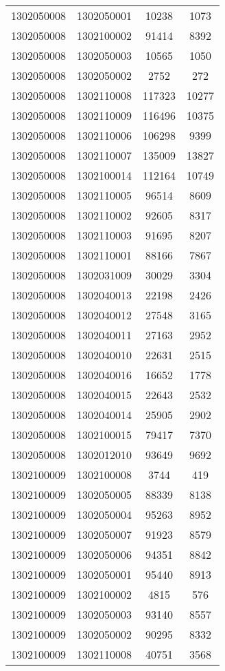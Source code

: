 \begin{longtable}{llcc}
1302050008 & 1302050001 & 10238 & 1073\\
1302050008 & 1302100002 & 91414 & 8392\\
1302050008 & 1302050003 & 10565 & 1050\\
1302050008 & 1302050002 & 2752 & 272\\
1302050008 & 1302110008 & 117323 & 10277\\
1302050008 & 1302110009 & 116496 & 10375\\
1302050008 & 1302110006 & 106298 & 9399\\
1302050008 & 1302110007 & 135009 & 13827\\
1302050008 & 1302100014 & 112164 & 10749\\
1302050008 & 1302110005 & 96514 & 8609\\
1302050008 & 1302110002 & 92605 & 8317\\
1302050008 & 1302110003 & 91695 & 8207\\
1302050008 & 1302110001 & 88166 & 7867\\
1302050008 & 1302031009 & 30029 & 3304\\
1302050008 & 1302040013 & 22198 & 2426\\
1302050008 & 1302040012 & 27548 & 3165\\
1302050008 & 1302040011 & 27163 & 2952\\
1302050008 & 1302040010 & 22631 & 2515\\
1302050008 & 1302040016 & 16652 & 1778\\
1302050008 & 1302040015 & 22643 & 2532\\
1302050008 & 1302040014 & 25905 & 2902\\
1302050008 & 1302100015 & 79417 & 7370\\
1302050008 & 1302012010 & 93649 & 9692\\
1302100009 & 1302100008 & 3744 & 419\\
1302100009 & 1302050005 & 88339 & 8138\\
1302100009 & 1302050004 & 95263 & 8952\\
1302100009 & 1302050007 & 91923 & 8579\\
1302100009 & 1302050006 & 94351 & 8842\\
1302100009 & 1302050001 & 95440 & 8913\\
1302100009 & 1302100002 & 4815 & 576\\
1302100009 & 1302050003 & 93140 & 8557\\
1302100009 & 1302050002 & 90295 & 8332\\
1302100009 & 1302110008 & 40751 & 3568\\

\end{longtable}

